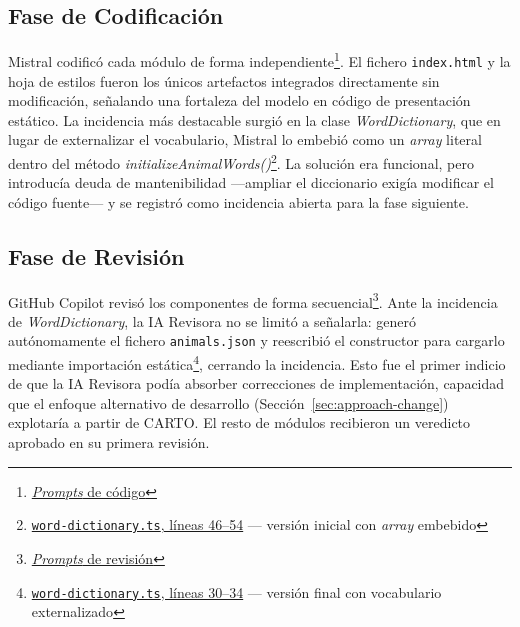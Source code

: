 \subsection{Fase de Codificación}

Mistral codificó cada módulo de forma independiente\footnote{\href{https://github.com/alu0101549491/TFG-Fabian-Gonzalez-Lence/tree/main/resources/prompts/1-TheHangmanGame/3-CodigoPorModulo}{\textit{Prompts} de código}}. El fichero \texttt{index.html} y la hoja de estilos fueron los únicos artefactos integrados directamente sin modificación, señalando una fortaleza del modelo en código de presentación estático. La incidencia más destacable surgió en la clase \textit{WordDictionary}, que en lugar de externalizar el vocabulario, Mistral lo embebió como un \textit{array} literal dentro del método \textit{initializeAnimalWords()}\footnote{\href{https://github.com/alu0101549491/TFG-Fabian-Gonzalez-Lence/blob/6ade2d937c5fc8507893551a8f82d8d46e6fcbb2/projects/1-TheHangmanGame/src/models/word-dictionary.ts\#L46-L54}{\texttt{word-dictionary.ts}, líneas 46--54} — versión inicial con \textit{array} embebido}. La solución era funcional, pero introducía deuda de mantenibilidad —ampliar el diccionario exigía modificar el código fuente— y se registró como incidencia abierta para la fase siguiente.

\subsection{Fase de Revisión}

GitHub Copilot revisó los componentes de forma secuencial\footnote{\href{https://github.com/alu0101549491/TFG-Fabian-Gonzalez-Lence/tree/main/resources/prompts/1-TheHangmanGame/4-RevisionPorModulo}{\textit{Prompts} de revisión}}. Ante la incidencia de \textit{WordDictionary}, la \ac{IA} Revisora no se limitó a señalarla: generó autónomamente el fichero \texttt{animals.json} y reescribió el constructor para cargarlo mediante importación estática\footnote{\href{https://github.com/alu0101549491/TFG-Fabian-Gonzalez-Lence/blob/main/projects/1-TheHangmanGame/src/models/word-dictionary.ts\#L30-L34}{\texttt{word-dictionary.ts}, líneas 30--34} — versión final con vocabulario externalizado}, cerrando la incidencia. Esto fue el primer indicio de que la \ac{IA} Revisora podía absorber correcciones de implementación, capacidad que el enfoque alternativo de desarrollo (Sección~\ref{sec:approach-change}) explotaría a partir de \ac{CARTO}. El resto de módulos recibieron un veredicto aprobado en su primera revisión.

